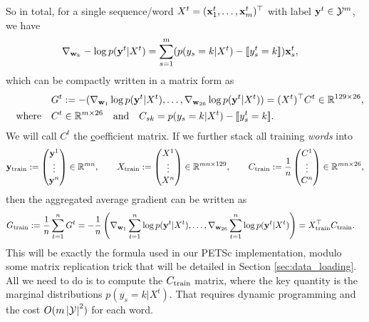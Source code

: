 \documentclass[11pt]{report}
\begin{document}
So in total, for a single sequence/word $X^t=(\mathbf{\boldsymbol{x}}^t_1, \ldots, \mathbf{\boldsymbol{x}}^t_m)^\top$ with label $\mathbf{\boldsymbol{y}}^t \in \mathcal{Y}^m$,
we have
\begin{align}
  {\nabla}_{\mathbf{\boldsymbol{w}}_k} -\log p(\mathbf{\boldsymbol{y}}^t|X^t) &= \sum_{s=1}^m ( p(y_s = k | X^t) - [\![y^t_s = k]\!]) \mathbf{\boldsymbol{x}}^t_s,
\end{align}
which can be compactly written in a matrix form as
\begin{align}
\label{eq:def_Gt}
  G^t &:= -({\nabla}_{\mathbf{\boldsymbol{w}}_1} \log p(\mathbf{\boldsymbol{y}}^t|X^t), \ldots, {\nabla}_{\mathbf{\boldsymbol{w}}_{26}} \log p(\mathbf{\boldsymbol{y}}^t|X^t))
  = (X^t)^\top C^t \in \mathbb{R}^{129 \times 26}, \\
\label{eq:def_Ct}
  {\quad \text{where} \quad} C^t &\in \mathbb{R}^{m \times 26} \quad \text{and} \quad C_{sk} =  p(y_s = k | X^t) - [\![y^t_s = k]\!].
\end{align}
%
We will call $C^t$ the {\underline c}oefficient matrix.
If we further stack all training \emph{words} into
\begin{align}
\label{eq:train_collect}
  {\mathbf{\boldsymbol{y}}_{\text{train}}} := \begin{pmatrix} \mathbf{\boldsymbol{y}}^1 \\ \vdots \\ \mathbf{\boldsymbol{y}}^n \end{pmatrix} \in \mathbb{R}^{mn},
  \qquad
  X_{\text{train}} := \begin{pmatrix} X^1 \\ \vdots \\ X^n \end{pmatrix} \in \mathbb{R}^{mn \times 129},
  \qquad
  {C_{\text{train}}} := \frac{1}{n} \begin{pmatrix} C^1 \\ \vdots \\ C^n \end{pmatrix} \in \mathbb{R}^{mn \times 26},
\end{align}
then the aggregated average gradient can be written as
\begin{align}
\label{eq:def_gradient}
  G_{\text{train}} := \frac{1}{n} \sum_{t=1}^n G^t &= -\frac{1}{n} \left({\nabla}_{\mathbf{\boldsymbol{w}}_1} \sum_{t=1}^n \log p(\mathbf{\boldsymbol{y}}^t|X^t), \ldots, {\nabla}_{\mathbf{\boldsymbol{w}}_{26}} \sum_{t=1}^n \log p(\mathbf{\boldsymbol{y}}^t|X^t)\right)
  = X_{\text{train}}^\top {C_{\text{train}}}.
\end{align}
%
This will be exactly the formula used in our PETSc implementation,
modulo some matrix replication trick that will be detailed in Section \ref{sec:data_loading}.
All we need to do is to compute the ${C_{\text{train}}}$ matrix,
where the key quantity is the marginal distributions $p(y_s = k | X^t)$.
That requires dynamic programming and the cost $O(m \left|\mathcal{Y}\right|^2)$ for each word.
\end{document}
